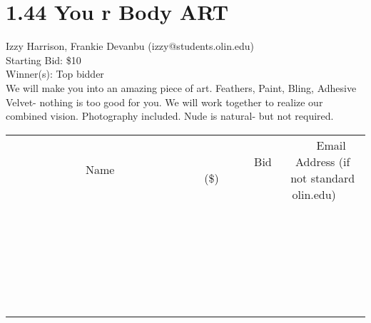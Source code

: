 \documentclass[11pt]{article}
\begin{document}
\section*{1.44 You r Body ART}
Izzy Harrison, Frankie Devanbu (izzy@students.olin.edu) \\
Starting Bid: \$10 \\
Winner(s): 
Top bidder \\
We will make you into an amazing piece of art. Feathers, Paint, Bling, Adhesive Velvet- nothing is too good for you. We will work together to realize our combined vision. Photography included. Nude is natural- but not required. \\[6ex]
\begin{tabular}{c c c}
~~~~~~~~~~~~~Name~~~~~~~~~~~~~ & ~~~~~~~~~Bid (\$)~~~~~~~~~ & ~~~Email Address (if not standard olin.edu)~~~ \\
 & & \\
\hline
 & & \\
\hline
 & & \\
\hline
 & & \\
\hline
 & & \\
\hline
 & & \\
\hline
 & & \\
\hline
 & & \\
\hline
 & & \\
\hline
 & & \\
\hline
 & & \\
\hline
 & & \\
\hline
 & & \\
\hline
 & & \\
\hline
 & & \\
\hline
 & & \\
\hline
 & & \\
\hline
 & & \\
\hline
 & & \\
\hline
 & & \\
\hline
 & & \\
\hline
 & & \\
\hline
 & & \\
\hline
 & & \\
\hline
 & & \\
\hline
 & & \\
\hline
\end{tabular}
\clearpage
\end{document}
